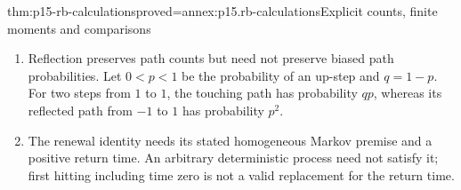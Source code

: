 \begin{hbtheorem}{thm:p15-rb-calculations}{proved=annex:p15.rb-calculations}{Explicit counts, finite moments and comparisons}
\begin{enumerate}
 \((0,1/2]\) and increases on \([1/2,1)\), and \(h(x)\to\infty\) as
 \(x\to0\) or \(x\to1\). Read through \(A_{2n}\), an equal division
 of the betting periods between the two players is the least likely
 region of the limit law, and nearly one-sided divisions are the most
 likely; this is the source's remark after its Theorem 4.9.6
 \cite[p.~266]{DurrettPTEAuthor2019}. The finite-\(n\) counterpart is
 the mass profile in item 3.
\item Reflection preserves path counts but need not preserve
 biased path probabilities. Let \(0<p<1\) be the probability
 of an up-step and \(q=1-p\). For two steps from \(1\) to \(1\),
 the touching path has probability \(qp\), whereas its reflected
 path from \(-1\) to \(1\) has probability \(p^2\).
\item The renewal identity needs its stated homogeneous Markov
 premise and a positive return time. An arbitrary deterministic
 process need not satisfy it; first hitting including time zero
 is not a valid replacement for the return time.
\end{enumerate}
\end{hbtheorem}

